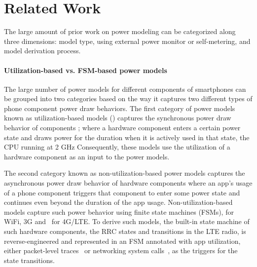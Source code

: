 \section{Related Work}
\label{sec:related}

The large amount of prior work on power modeling can be categorized along three dimensions: 
model type, using external power monitor or self-metering, and model derivation process.

\paragraph{Utilization-based vs. FSM-based power models} 
The large number of power models for different components of 
smartphones can be grouped into two categories
based on the way it captures two different types of phone component power draw behaviors. 
The first category of power models known as utilization-based models
(\eg \cite{shye2009into,zhang2010accurate,hotpowermulticore}) 
captures the synchronous power draw behavior of  components ; where
a hardware component enters a certain power state and draws power for the duration
when it is actively used in that state, \eg the CPU running at 2 GHz 
Consequently, these models use the utilization of a hardware component as an input to the power models.


The second category known as non-utilization-based power models captures the asynchronous power 
draw behavior of hardware components where an app’s usage of a phone component
triggers that component to enter some power state and continues even beyond the duration of the app usage.
Non-utilization-based models capture such power behavior using finite state machines (FSMs),
\eg \cite{arunabimc09,energybasedRA,aro,whatsup:mobicom12,pathak:eurosys12,ding:sigmetrics13}
for WiFi, 3G and~\cite{4glte} for 4G/LTE. 
To derive such models, the built-in state machine of such hardware components, \eg the RRC states and
transitions in the LTE radio, is reverse-engineered and represented in an FSM
annotated with app utilization, \eg either packet-level traces~\cite{rrc:imc2010,4glte} or
networking system calls~\cite{pathak:eurosys12}, as the triggers for the state transitions.

